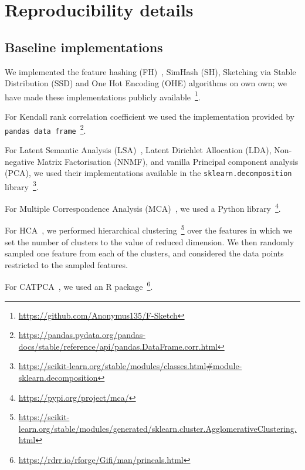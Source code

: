\section{ Reproducibility details}\label{sec:Reproducibility_details}
\subsection{Baseline implementations }\label{sec:Reproducibility_baseline}

\begin{enumerate}
 \item  We implemented the {feature hashing (FH)}~\cite{WeinbergerDLSA09},   {SimHash (SH)}\cite{simhash}, {Sketching via Stable Distribution (SSD)}\cite{SSD} and {One Hot Encoding (OHE)}\cite{ICDM} algorithms on own own; we have made these implementations publicly available~\footnote{\url{https://github.com/Anonymus135/F-Sketch}}.
 \item For  {Kendall rank correlation coefficient}\cite{kendall1938measure} we used the implementation provided by \texttt{pandas data frame}~\footnote{\url{https://pandas.pydata.org/pandas-docs/stable/reference/api/pandas.DataFrame.corr.html}}. 
 \item For {Latent Semantic Analysis (LSA)}~\cite{LSI}, {Latent Dirichlet Allocation (LDA)}\cite{LDA}, {Non-negative Matrix Factorisation (NNMF)}\cite{NNMF}, and  vanilla {Principal component analysis (PCA)}, we used their implementations available in the \texttt{sklearn.decomposition} library~\footnote{\url{https://scikit-learn.org/stable/modules/classes.html\#module-sklearn.decomposition}}.
 \item For {Multiple Correspondence Analysis (MCA)}~\cite{MCA}, we used a Python library~\footnote{\url{https://pypi.org/project/mca/}}.
 \item { For HCA~\cite{Sulc2015DimensionalityRO}, we performed hierarchical clustering~\footnote{\url{https://scikit-learn.org/stable/modules/generated/sklearn.cluster.AgglomerativeClustering.html}} over the features in which we set the number of clusters to the value of reduced dimension. We then randomly sampled one feature from each of the clusters, and considered the data points restricted to the sampled features.
 \item For CATPCA~\cite{Sulc2015DimensionalityRO}, we
used an R package~\footnote{\url{https://rdrr.io/rforge/Gifi/man/princals.html}}.}

 \end{enumerate}
